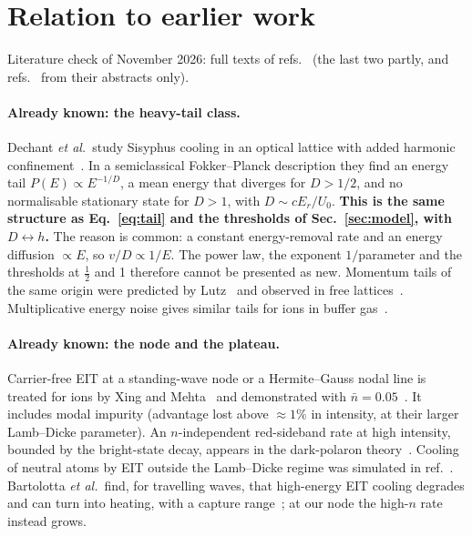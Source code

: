 \documentclass[11pt,a4paper]{article}
\begin{document}
\section{Relation to earlier work}
\label{sec:prior}
Literature check of November 2026: full texts of refs.~\cite{phatak2024,bartolotta2024,xing2025,dechant2016,morillas2026} (the last two partly, and refs.~\cite{he2017,roghani2008} from their abstracts only).

\paragraph{Already known: the heavy-tail class.} Dechant \emph{et al.}\ study Sisyphus cooling in an optical lattice with added harmonic confinement~\cite{dechant2015,dechant2016}. In a semiclassical Fokker--Planck description they find an energy tail $P(E)\propto E^{-1/D}$, a mean energy that diverges for $D>1/2$, and no normalisable stationary state for $D>1$, with $D\sim cE_r/U_0$. \textbf{This is the same structure as Eq.~\eqref{eq:tail} and the thresholds of Sec.~\ref{sec:model}, with $D\leftrightarrow h$.} The reason is common: a constant energy-removal rate and an energy diffusion $\propto E$, so $v/D\propto1/E$. The power law, the exponent $1/$parameter and the thresholds at $\tfrac12$ and 1 therefore cannot be presented as new. Momentum tails of the same origin were predicted by Lutz~\cite{lutz2003} and observed in free lattices~\cite{douglas2006}. Multiplicative energy noise gives similar tails for ions in buffer gas~\cite{devoe2009,rouse2017}.

\paragraph{Already known: the node and the plateau.} Carrier-free EIT at a standing-wave node or a Hermite--Gauss nodal line is treated for ions by Xing and Mehta~\cite{xing2025} and demonstrated with $\bar n=0.05$~\cite{xing2026}. It includes modal impurity (advantage lost above $\approx1\%$ in intensity, at their larger Lamb--Dicke parameter). An $n$-independent red-sideband rate at high intensity, bounded by the bright-state decay, appears in the dark-polaron theory~\cite{morillas2026}. Cooling of neutral atoms by EIT outside the Lamb--Dicke regime was simulated in ref.~\cite{roghani2008}. Bartolotta \emph{et al.}\ find, for travelling waves, that high-energy EIT cooling degrades and can turn into heating, with a capture range~\cite{bartolotta2024}; at our node the high-$n$ rate instead grows.
\end{document}
